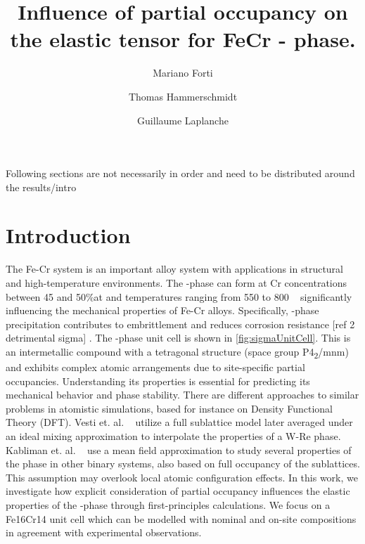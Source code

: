 \documentclass[superscriptaddress, 12pt]{revtex4-2}%
\date{}
\begin{document}
\title{Influence of partial occupancy on the elastic tensor for FeCr \textsigma - phase.}

\author{Mariano Forti} 

\author{Thomas Hammerschmidt} \email{}

\author{Guillaume Laplanche} \email{}


Following sections are not necessarily in order and need to be distributed
around the results/intro

\maketitle

\section{Introduction}

The Fe-Cr system is an important alloy system with applications in structural and high-temperature environments. The
\textsigma-phase can form at Cr concentrations between 45 and 50\%at and temperatures ranging from 550 to 800\textdegree
~\cite{laplanche_phase_2018} significantly influencing the mechanical properties of Fe-Cr alloys. Specifically,
\textsigma-phase precipitation contributes to embrittlement and reduces corrosion resistance {\color{red}  [ref 2
detrimental sigma] }. The \textsigma-phase unit cell is shown in \autoref{fig:sigmaUnitCell}. This is an intermetallic
compound with a tetragonal structure (space group P4\textsubscript{2}/mnm) and exhibits complex atomic arrangements due
to site-specific partial occupancies.  Understanding its properties is essential for predicting its mechanical behavior
and phase stability.  There are different approaches to similar problems in atomistic simulations, based for instance on
Density Functional Theory (DFT). Vesti et. al. ~\cite{vesti_ab-initio_2023} utilize a full sublattice model later
averaged under an ideal mixing approximation to interpolate the properties of a W-Re \textsigma phase. Kabliman et. al.
~\cite{kabliman_ab_2012} use a mean field approximation to study several properties of the \textsigma phase in other
binary systems, also based on full occupancy of the sublattices. This assumption may overlook local atomic configuration
effects.  In this work, we investigate how explicit consideration of partial occupancy influences the elastic properties
of the \textsigma-phase through first-principles calculations. We focus on a Fe16Cr14 unit cell which can be modelled
with nominal and on-site compositions in agreement with experimental observations.
\end{document}
